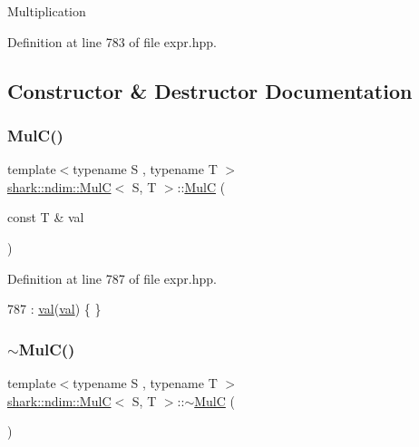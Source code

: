 Multiplication 

Definition at line 783 of file expr.\+hpp.



\subsection{Constructor \& Destructor Documentation}
\hypertarget{classshark_1_1ndim_1_1_mul_c_aea6eccffd6c63cc792714e48c9dc1c9e}{}\label{classshark_1_1ndim_1_1_mul_c_aea6eccffd6c63cc792714e48c9dc1c9e} 
\subsubsection{\texorpdfstring{Mul\+C()}{MulC()}}
{\footnotesize\ttfamily template$<$typename S , typename T $>$ \\
\hyperlink{classshark_1_1ndim_1_1_mul_c}{shark\+::ndim\+::\+MulC}$<$ S, T $>$\+::\hyperlink{classshark_1_1ndim_1_1_mul_c}{MulC} (\begin{DoxyParamCaption}\item[{const T \&}]{val }\end{DoxyParamCaption})\hspace{0.3cm}{\ttfamily [inline]}}



Definition at line 787 of file expr.\+hpp.


\begin{DoxyCode}
787 : \hyperlink{classshark_1_1ndim_1_1_mul_c_adf2e920c0c3a31d93f551ba6d75170cd}{val}(\hyperlink{classshark_1_1ndim_1_1_mul_c_adf2e920c0c3a31d93f551ba6d75170cd}{val}) \{ \}
\end{DoxyCode}
\hypertarget{classshark_1_1ndim_1_1_mul_c_a045d8909667e5ccf881459f35119b74e}{}\label{classshark_1_1ndim_1_1_mul_c_a045d8909667e5ccf881459f35119b74e} 
\subsubsection{\texorpdfstring{$\sim$\+Mul\+C()}{~MulC()}}
{\footnotesize\ttfamily template$<$typename S , typename T $>$ \\
\hyperlink{classshark_1_1ndim_1_1_mul_c}{shark\+::ndim\+::\+MulC}$<$ S, T $>$\+::$\sim$\hyperlink{classshark_1_1ndim_1_1_mul_c}{MulC} (\begin{DoxyParamCaption}{ }\end{DoxyParamCaption})\hspace{0.3cm}{\ttfamily [inline]}}



